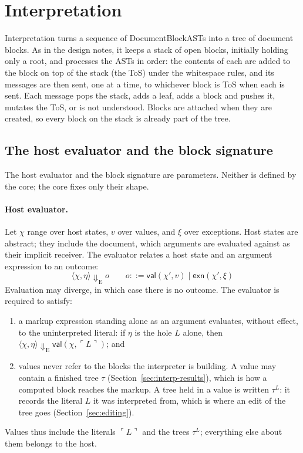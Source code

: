 \documentclass[11pt]{article}
\numberwithin{equation}{section}
\newcommand{\kw}[1]{\ensuremath{\mathsf{#1}}}
\begin{document}
\section{Interpretation}
\label{sec:interpretation}

Interpretation turns a sequence of DocumentBlockASTs into a tree of
document blocks.  As in the design notes, it keeps a stack of open blocks,
initially holding only a root, and processes the ASTs in order: the
contents of each are added to the block on top of the stack (the ToS)
under the whitespace rules, and its messages are then sent, one at a time,
to whichever block is ToS when each is sent.  Each message pops the stack,
adds a leaf, adds a block and pushes it, mutates the ToS, or is not
understood.  Blocks are attached when they are created, so every block on
the stack is already part of the tree.

\subsection{The host evaluator and the block signature}

The host evaluator and the block signature are parameters.  Neither is
defined by the core; the core fixes only their shape.

\paragraph{Host evaluator.}
Let $\chi$ range over host states, $v$ over values, and $\xi$ over
exceptions.  Host states are abstract; they include the document, which
arguments are evaluated against as their implicit receiver.  The
evaluator relates a host state and an argument expression to an outcome:
\begin{equation}\label{eq:host-evaluator}
\langle \chi, \eta \rangle \Downarrow_{\mathrm{E}} o
\qquad
o ::= \kw{val}(\chi', v) \mid \kw{exn}(\chi', \xi)
\end{equation}
Evaluation may diverge, in which case there is no outcome.  The evaluator
is required to satisfy:
\begin{enumerate}
\item[(E1)] a markup expression standing alone as an argument evaluates,
      without effect, to the uninterpreted literal: if $\eta$ is the hole
      $L$ alone, then
      $\langle \chi, \eta \rangle \Downarrow_{\mathrm{E}}
        \kw{val}(\chi, \ulcorner L \urcorner)$; and
\item[(E2)] values never refer to the blocks the interpreter is building.
      A value may contain a finished tree $\tau$
      (Section~\ref{sec:interp-results}), which is how a computed block
      reaches the markup.  A tree held in a value is written $\tau^{L}$:
      it records the literal $L$ it was interpreted from, which is where an
      edit of the tree goes (Section~\ref{sec:editing}).
\end{enumerate}
Values thus include the literals $\ulcorner L \urcorner$ and the trees
$\tau^{L}$; everything else about them belongs to the host.
\end{document}
